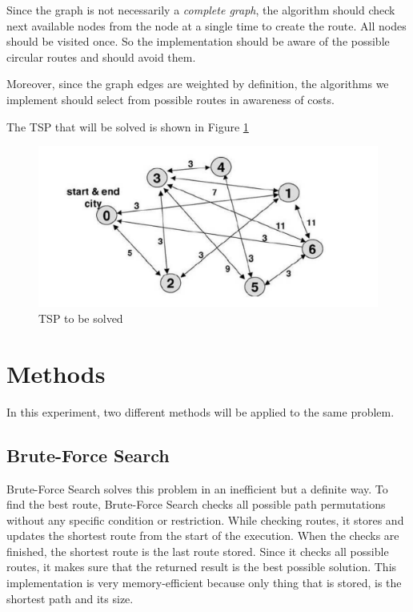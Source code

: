 \documentclass[journal,transmag]{IEEEtran}
\begin{document}
    Since the graph is not necessarily a \textit{complete graph}, the algorithm
    should check next available nodes from the node at a single time to create
    the route. All nodes should be visited once. So the implementation should be
    aware of the possible circular routes and should avoid them.

    Moreover, since the graph edges are weighted by definition, the algorithms we
    implement should select from possible routes in awareness of costs.

    The TSP that will be solved is shown in Figure \ref{fig:tsp-problem}

    \begin{figure}[h!]
        \includegraphics[width=\linewidth]{tsp.png}
        \caption{TSP to be solved}
        \label{fig:tsp-problem}
    \end{figure}


    \section{Methods}

    In this experiment, two different methods will be applied to the same problem.

    \subsection{Brute-Force Search}

    Brute-Force Search solves this problem in an inefficient but a definite way.
    To find the best route, Brute-Force Search checks all possible path
    permutations without any specific condition or restriction. While checking
    routes, it stores and updates the shortest route from the start of the
    execution. When the checks are finished, the shortest route is the last
    route stored. Since it checks all possible routes, it makes sure that the
    returned result is the best possible solution. This implementation is very
    memory-efficient because only thing that is stored, is the shortest path and
    its size.
\end{document}
